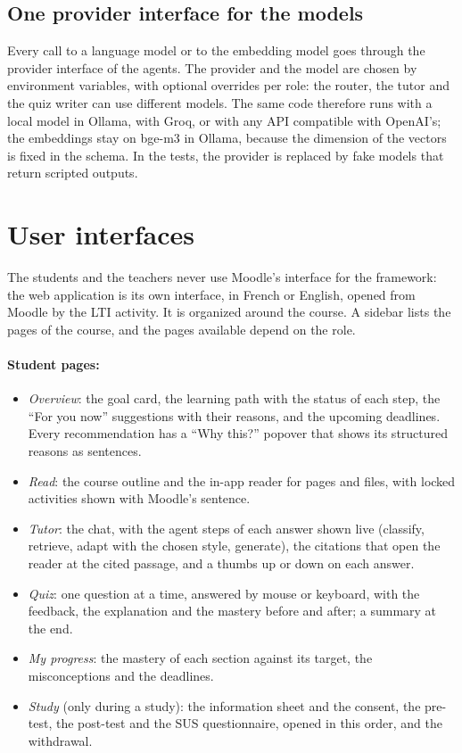 \subsection{One provider interface for the models}

Every call to a language model or to the embedding model goes through
the provider interface of the agents. The provider and the model are
chosen by environment variables, with optional overrides per role: the
router, the tutor and the quiz writer can use different models. The same
code therefore runs with a local model in Ollama, with Groq, or with any
API compatible with OpenAI's; the embeddings stay on bge-m3 in Ollama,
because the dimension of the vectors is fixed in the schema. In the
tests, the provider is replaced by fake models that return scripted
outputs.

\section{User interfaces}
\label{sec-d-ui}

The students and the teachers never use Moodle's interface for the
framework: the web application is its own interface, in French or
English, opened from Moodle by the LTI activity. It is organized around
the course. A sidebar lists the pages of the course, and the pages
available depend on the role.

\paragraph{Student pages:}
\begin{itemize}
  \item \emph{Overview}: the goal card, the learning path with the status
        of each step, the ``For you now'' suggestions with their reasons,
        and the upcoming deadlines. Every recommendation has a ``Why
        this?'' popover that shows its structured reasons as sentences.
  \item \emph{Read}: the course outline and the in-app reader for pages
        and files, with locked activities shown with Moodle's sentence.
  \item \emph{Tutor}: the chat, with the agent steps of each answer shown
        live (classify, retrieve, adapt with the chosen style, generate),
        the citations that open the reader at the cited passage, and a
        thumbs up or down on each answer.
  \item \emph{Quiz}: one question at a time, answered by mouse or keyboard,
        with the feedback, the explanation and the mastery before and
        after; a summary at the end.
  \item \emph{My progress}: the mastery of each section against its target,
        the misconceptions and the deadlines.
  \item \emph{Study} (only during a study): the information sheet and the
        consent, the pre-test, the post-test and the SUS questionnaire,
        opened in this order, and the withdrawal.
\end{itemize}

